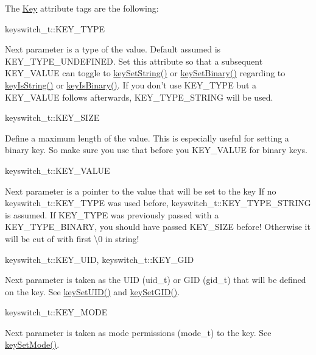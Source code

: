 The \hyperlink{classkdb_1_1Key}{Key} attribute tags are the following\-:
\begin{DoxyItemize}
\item keyswitch\-\_\-t\-::\-K\-E\-Y\-\_\-\-T\-Y\-P\-E \par
 Next parameter is a type of the value. Default assumed is K\-E\-Y\-\_\-\-T\-Y\-P\-E\-\_\-\-U\-N\-D\-E\-F\-I\-N\-E\-D. Set this attribute so that a subsequent K\-E\-Y\-\_\-\-V\-A\-L\-U\-E can toggle to \hyperlink{group__keyvalue_ga622bde1eb0e0c4994728331326340ef2}{key\-Set\-String()} or \hyperlink{group__keyvalue_gaa50a5358fd328d373a45f395fa1b99e7}{key\-Set\-Binary()} regarding to \hyperlink{group__keytest_gaea7670778abd07fee0fe8ac12a149190}{key\-Is\-String()} or \hyperlink{group__keytest_ga9526b371087564e43e3dff8ad0dac949}{key\-Is\-Binary()}. If you don't use K\-E\-Y\-\_\-\-T\-Y\-P\-E but a K\-E\-Y\-\_\-\-V\-A\-L\-U\-E follows afterwards, K\-E\-Y\-\_\-\-T\-Y\-P\-E\-\_\-\-S\-T\-R\-I\-N\-G will be used.
\item keyswitch\-\_\-t\-::\-K\-E\-Y\-\_\-\-S\-I\-Z\-E \par
 Define a maximum length of the value. This is especially useful for setting a binary key. So make sure you use that before you K\-E\-Y\-\_\-\-V\-A\-L\-U\-E for binary keys.
\item keyswitch\-\_\-t\-::\-K\-E\-Y\-\_\-\-V\-A\-L\-U\-E \par
 Next parameter is a pointer to the value that will be set to the key If no keyswitch\-\_\-t\-::\-K\-E\-Y\-\_\-\-T\-Y\-P\-E was used before, keyswitch\-\_\-t\-::\-K\-E\-Y\-\_\-\-T\-Y\-P\-E\-\_\-\-S\-T\-R\-I\-N\-G is assumed. If K\-E\-Y\-\_\-\-T\-Y\-P\-E was previously passed with a K\-E\-Y\-\_\-\-T\-Y\-P\-E\-\_\-\-B\-I\-N\-A\-R\-Y, you should have passed K\-E\-Y\-\_\-\-S\-I\-Z\-E before! Otherwise it will be cut of with first \textbackslash{}0 in string!
\item keyswitch\-\_\-t\-::\-K\-E\-Y\-\_\-\-U\-I\-D, {\ttfamily keyswitch\-\_\-t\-::\-K\-E\-Y\-\_\-\-G\-I\-D} \par
 Next parameter is taken as the U\-I\-D (uid\-\_\-t) or G\-I\-D (gid\-\_\-t) that will be defined on the key. See \hyperlink{group__keymeta_gab5f284f5ecd261e0a290095f50ba1af7}{key\-Set\-U\-I\-D()} and \hyperlink{group__keymeta_ga9e3d0fb3f7ba906e067727b9155d22e3}{key\-Set\-G\-I\-D()}.
\item keyswitch\-\_\-t\-::\-K\-E\-Y\-\_\-\-M\-O\-D\-E \par
 Next parameter is taken as mode permissions (mode\-\_\-t) to the key. See \hyperlink{group__keymeta_ga8803037e35b9da1ce492323a88ff6bc3}{key\-Set\-Mode()}.

\end{DoxyItemize}
